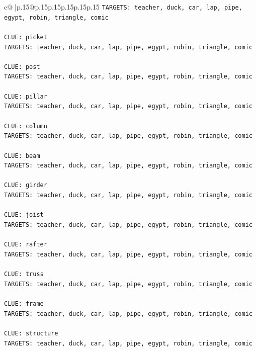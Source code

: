 \documentclass{article}
\begin{document}
{\begin{supertabular}{c@{$\;$}|p{.15\linewidth}@{}p{.15\linewidth}p{.15\linewidth}p{.15\linewidth}p{.15\linewidth}p{.15\linewidth}}
{{{\texttt{TARGETS: teacher, duck, car, lap, pipe, egypt, robin, triangle, comic} \\
\\ 
\texttt{CLUE: picket} \\
\texttt{TARGETS: teacher, duck, car, lap, pipe, egypt, robin, triangle, comic} \\
\\ 
\texttt{CLUE: post} \\
\texttt{TARGETS: teacher, duck, car, lap, pipe, egypt, robin, triangle, comic} \\
\\ 
\texttt{CLUE: pillar} \\
\texttt{TARGETS: teacher, duck, car, lap, pipe, egypt, robin, triangle, comic} \\
\\ 
\texttt{CLUE: column} \\
\texttt{TARGETS: teacher, duck, car, lap, pipe, egypt, robin, triangle, comic} \\
\\ 
\texttt{CLUE: beam} \\
\texttt{TARGETS: teacher, duck, car, lap, pipe, egypt, robin, triangle, comic} \\
\\ 
\texttt{CLUE: girder} \\
\texttt{TARGETS: teacher, duck, car, lap, pipe, egypt, robin, triangle, comic} \\
\\ 
\texttt{CLUE: joist} \\
\texttt{TARGETS: teacher, duck, car, lap, pipe, egypt, robin, triangle, comic} \\
\\ 
\texttt{CLUE: rafter} \\
\texttt{TARGETS: teacher, duck, car, lap, pipe, egypt, robin, triangle, comic} \\
\\ 
\texttt{CLUE: truss} \\
\texttt{TARGETS: teacher, duck, car, lap, pipe, egypt, robin, triangle, comic} \\
\\ 
\texttt{CLUE: frame} \\
\texttt{TARGETS: teacher, duck, car, lap, pipe, egypt, robin, triangle, comic} \\
\\ 
\texttt{CLUE: structure} \\
\texttt{TARGETS: teacher, duck, car, lap, pipe, egypt, robin, triangle, comic} \\
}}}
\end{supertabular}}
\end{document}

